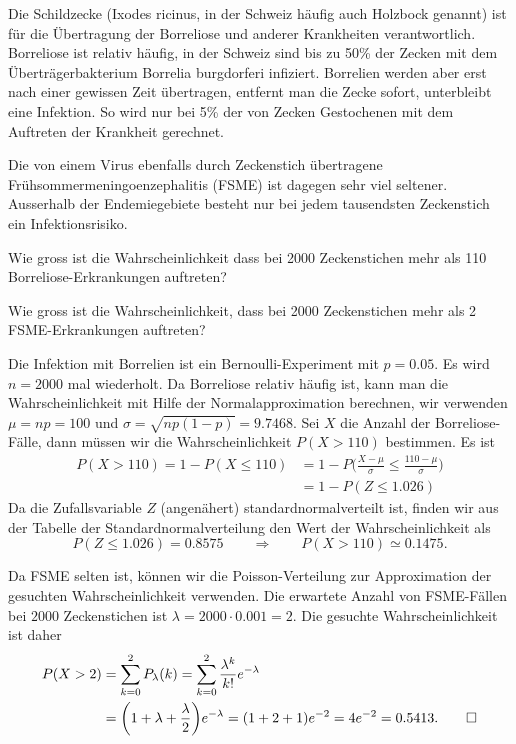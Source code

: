 Die Schildzecke (Ixodes ricinus, in der Schweiz häufig auch Holzbock genannt) 
ist für die Über\-tragung der Borreliose und anderer Krankheiten verantwortlich.
Borreliose ist relativ häufig, in der Schweiz sind bis zu 50\% der Zecken mit
dem Überträgerbakterium Borrelia burgdorferi infiziert.
Borrelien werden aber erst nach einer gewissen Zeit übertragen,
entfernt man die Zecke sofort, unterbleibt eine Infektion.
So wird nur bei 5\% der von Zecken Gestochenen mit dem Auftreten
der Krankheit gerechnet.

Die von einem Virus ebenfalls durch Zeckenstich übertragene
Frühsommermeningoenzephalitis (FSME) ist dagegen sehr viel seltener.
Ausserhalb der Endemiegebiete besteht nur bei jedem tausendsten Zeckenstich
ein Infektionsrisiko.

\begin{teilaufgaben}
\item
Wie gross ist die Wahrscheinlichkeit dass bei 2000 Zeckenstichen mehr als 110
Borreliose-Erkrankungen auftreten?
\item
Wie gross ist die Wahrscheinlichkeit, dass bei 2000 Zeckenstichen mehr als 2
FSME-Er\-kran\-kun\-gen auftreten?
\end{teilaufgaben}

\begin{loesung}
\begin{teilaufgaben}
\item
Die Infektion mit Borrelien ist ein Bernoulli-Experiment mit $p=0.05$.
Es wird $n=2000$ mal wiederholt.
Da Borreliose relativ häufig ist, kann man die Wahrscheinlichkeit mit
Hilfe der Normalapproximation berechnen, wir verwenden
$\mu=np=100$ und $\sigma=\sqrt{np(1-p)}=9.7468$.
Sei $X$ die Anzahl der Borreliose-Fälle, dann müssen wir die
Wahrscheinlichkeit $P(X>110)$ bestimmen.
Es ist
\begin{align*}
P(X>110)
=
1-P(X\le 110)
&=
1-P\biggl(\frac{X-\mu}{\sigma}\le \frac{110-\mu}{\sigma}\biggr)
\\
&=
1-P(Z\le 1.026)
\end{align*}
Da die Zufallsvariable $Z$ (angenähert) standardnormalverteilt ist, finden wir
aus der Tabelle der Standardnormalverteilung den Wert der Wahrscheinlichkeit
als 
\[ 
P(Z\le 1.026) = 0.8575
\qquad\Rightarrow\qquad
P(X>110)\simeq 0.1475.
\]
\item
Da FSME selten ist, können wir die Poisson-Verteilung zur Approximation der
gesuchten Wahrscheinlichkeit verwenden.
Die erwartete Anzahl von FSME-Fällen bei $2000$ Zeckenstichen ist
$\lambda = 2000\cdot 0.001=2$.
Die gesuchte Wahrscheinlichkeit ist daher
\begin{align*}
P(X>2)
&=
\sum_{k=0}^2 P_\lambda(k)
=
\sum_{k=0}^2 \frac{\lambda^k}{k!} e^{-\lambda}
\\
&=
\biggl(1+\lambda+\frac{\lambda}2\biggr) e^{-\lambda}
=
(1+2+1) e^{-2}=4e^{-2}
=
0.5413.
\qedhere
\end{align*}
\end{teilaufgaben}
\end{loesung}




